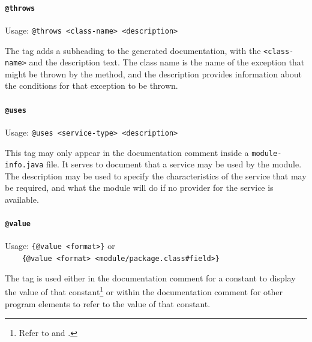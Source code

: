 
\paragraph{\lstinline|@throws|}\label{sec:TagThrows}  Usage: \lstinline|@throws <class-name> <description>|

The  tag adds a  subheading to the generated documentation, with the \texttt{<class-name>} and the description text. The class name is the name of the exception that might be thrown by the method, and the description provides information about the conditions for that exception to be thrown. 


\paragraph{\lstinline|@uses|}\label{sec:TagUses}  Usage: \lstinline|@uses <service-type> <description>|

This tag may only appear in the documentation comment inside a \texttt{module-info.java} file. It serves to document that a service may be used by the module. The description may be used to specify the characteristics of the service that may be required, and what the module will do if no provider for the service is available.


\paragraph{\lstinline|@value|}\label{sec:TagValue}  Usage: \lstinline|{@value <format>}| or \\ 
\lstinline|    {@value <format> <module/package.class#field>}|

The  tag is used either in the documentation comment for a constant to display the value of that constant\footnote{Refer to \pageref{sec:Constants} and \pageref{lbl:Constant}.} or within the documentation comment for other program elements to refer to the value of that constant.

